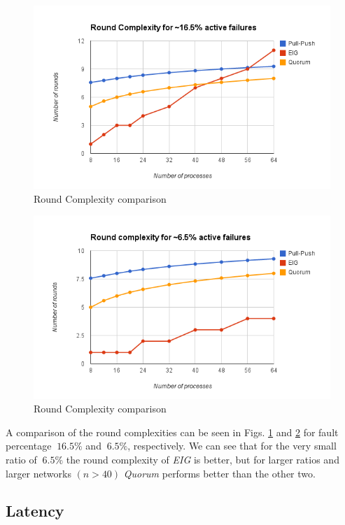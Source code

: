 \begin{figure}[ht] \centering 
    \includegraphics[scale=0.4]{Round16}  \caption{Round
    Complexity comparison} \label{fig:round16}  \end{figure}

\begin{figure}[ht] \centering \includegraphics[scale=0.4]{Round6}
    \caption{Round Complexity comparison} \label{fig:round6}
    \end{figure}

A comparison of the round complexities can be seen in Figs. \ref{fig:round16}
and \ref{fig:round6} for fault percentage $~16.5\%$ and $~6.5\%$, respectively.
We can see that for the very small ratio of $~6.5\%$ the round complexity of
\textit{EIG} is better, but for larger ratios and larger networks $(n > 40)$
\textit{Quorum} performs better than the other two. 


\subsection{Latency}

